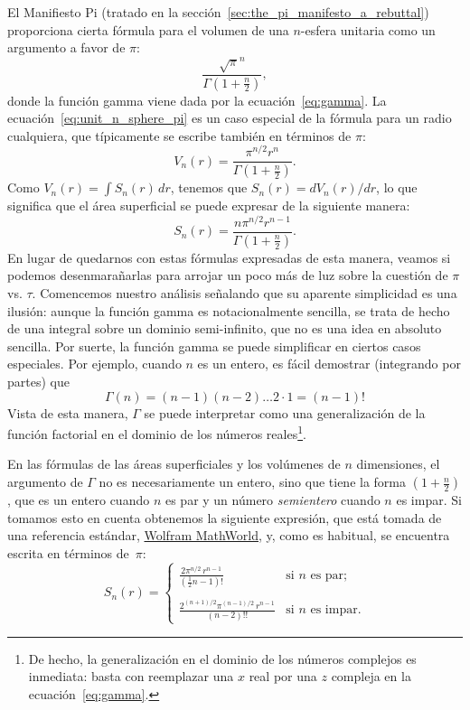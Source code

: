 El Manifiesto Pi (tratado en la sección~\ref{sec:the_pi_manifesto_a_rebuttal}) proporciona cierta fórmula para el volumen de una $n$-esfera unitaria como un argumento a favor de $\pi$:
\begin{equation}
\label{eq:unit_n_sphere_pi}
\frac{\sqrt{\pi}^{n} }{\Gamma(1 + \frac{n}{2})},
\end{equation}
donde la función gamma viene dada por la ecuación~\eqref{eq:gamma}. La ecuación~\eqref{eq:unit_n_sphere_pi} es un caso especial de la fórmula para un radio cualquiera, que típicamente se escribe también en términos de $\pi$:
\begin{equation}
\label{eq:n_sphere_pi}
V_n(r) = \frac{\pi^{n/2} r^n}{\Gamma(1 + \frac{n}{2})}.
\end{equation}
Como $V_n(r) = \int S_n(r)\,dr$, tenemos que $S_n(r) = dV_n(r)/dr$, lo que significa que el área superficial se puede expresar de la siguiente manera:
\begin{equation}
\label{eq:n_sphere_pi_r}
S_n(r) = \frac{n \pi^{n/2} r^{n-1}}{\Gamma(1 + \frac{n}{2})}.
\end{equation}
En lugar de quedarnos con estas fórmulas expresadas de esta manera, veamos si podemos desenmarañarlas para arrojar un poco más de luz sobre la cuestión de $\pi$ vs. $\tau$. Comencemos nuestro análisis señalando que su aparente simplicidad es una ilusión: aunque la función gamma es notacionalmente sencilla, se trata de hecho de una integral sobre un dominio semi-infinito, que no es una idea en absoluto sencilla. Por suerte, la función gamma se puede simplificar en ciertos casos especiales. Por ejemplo, cuando $n$ es un entero, es fácil demostrar (integrando por partes) que
\[
\Gamma(n) = (n-1)(n-2)\ldots 2\cdot 1 = (n-1)!
\]
Vista de esta manera, $\Gamma$ se puede interpretar como una generalización de la función factorial en el dominio de los números reales\footnote{De hecho, la generalización en el dominio de los números complejos es inmediata: basta con reemplazar una $x$ real por una  $z$ compleja en la ecuación~\eqref{eq:gamma}.}.

En las fórmulas de las áreas superficiales y los volúmenes de $n$ dimensiones, el argumento de $\Gamma$ no es necesariamente un entero, sino que tiene la forma $\left(1 + \frac{n}{2}\right)$, que es un entero cuando $n$ es par y un número \emph{semientero} cuando $n$ es impar. Si tomamos esto en cuenta obtenemos la siguiente expresión, que está tomada de una referencia estándar, \href{http://mathworld.wolfram.com/Hypersphere.html}{Wolfram MathWorld}, y, como es habitual, se encuentra escrita en términos de~$\pi$:
\begin{equation}
\label{eq:surface_area_mathworld}
S_n(r) = \begin{cases}
\displaystyle \frac{2\pi^{n/2}\,r^{n-1}}{(\frac{1}{2}n - 1)!} & \text{si } n \text{ es par}; \\ \\
 \displaystyle \frac{2^{(n+1)/2}\pi^{(n-1)/2}\,r^{n-1}}{(n-2)!!} & \text{si } n \text{ es impar}.
\end{cases}
\end{equation}


